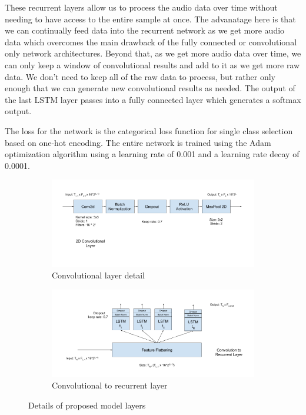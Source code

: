 \documentclass{article}
\begin{document}
These recurrent layers allow us to process
the audio data over time without needing to have access to the entire
sample at once. The advanatage here is that we can continually feed
data into the recurrent network as we get more audio data which
overcomes the main drawback of the fully connected or convolutional
only network architectures. Beyond that, as we get more audio data
over time, we can only keep a window of convolutional results and add
to it as we get more raw data. We don't need to keep all of the raw
data to process, but rather only enough that we can generate new
convolutional results as needed. The output of the last LSTM layer
passes into a fully connected layer which generates a softmax output.

The loss for the network is the categorical loss function for single
class selection based on one-hot encoding. The entire network is
trained using the Adam optimization algorithm using a learning rate of
0.001 and a learning rate decay of 0.0001.

\begin{figure}
  \begin{subfigure}{.5\linewidth}
    \includegraphics[width=\linewidth]{images/crnn-conv_layer}
    \caption{Convolutional layer detail}
    \label{fig:crnn-conv}
  \end{subfigure}%
  \begin{subfigure}{.5\linewidth}
    \includegraphics[width=\linewidth]{images/crnn-lstm_layer}
    \caption{Convolutional to recurrent layer}
    \label{fig:crnn-lstm}
  \end{subfigure}
  \caption{Details of proposed model layers}
\end{figure}
\end{document}
